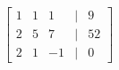 \documentclass[preview]{standalone}
\begin{document}
\begin{align*}
\begin{bmatrix} 1 & 1 & 1 & | & 9 \\ 2 & 5 & 7 & | & 52 \\ 2 & 1 & -1 & | & 0 \end{bmatrix}
\end{align*}
\end{document}
